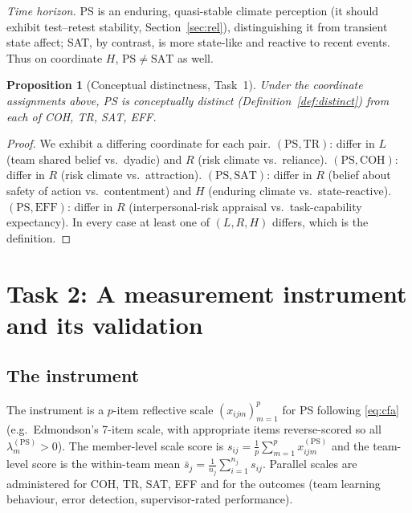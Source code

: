 \documentclass{amsart}
\newtheorem{proposition}{Proposition}
\theoremstyle{remark}
\begin{document}
\emph{Time horizon.} PS is an enduring, quasi-stable climate perception (it should
exhibit test--retest stability, Section~\ref{sec:rel}), distinguishing it from
transient state affect; SAT, by contrast, is more state-like and reactive to recent
events. Thus on coordinate $H$, $\mathrm{PS}\neq\mathrm{SAT}$ as well.

\begin{proposition}[Conceptual distinctness, Task~1]\label{prop:concept}
Under the coordinate assignments above, PS is conceptually distinct
(Definition~\ref{def:distinct}) from each of COH, TR, SAT, EFF.
\end{proposition}
\begin{proof}
We exhibit a differing coordinate for each pair. $(\mathrm{PS},\mathrm{TR})$:
differ in $L$ (team shared belief vs.\ dyadic) and $R$ (risk climate vs.\
reliance). $(\mathrm{PS},\mathrm{COH})$: differ in $R$ (risk climate vs.\
attraction). $(\mathrm{PS},\mathrm{SAT})$: differ in $R$ (belief about safety of
action vs.\ contentment) and $H$ (enduring climate vs.\ state-reactive).
$(\mathrm{PS},\mathrm{EFF})$: differ in $R$ (interpersonal-risk appraisal vs.\
task-capability expectancy). In every case at least one of $(L,R,H)$ differs, which
is the definition. \end{proof}

\section{Task 2: A measurement instrument and its validation}\label{sec:meas}

\subsection{The instrument}
The instrument is a $p$-item reflective scale $(x_{ijm})_{m=1}^{p}$ for PS
following \eqref{eq:cfa} (e.g.\ Edmondson's 7-item scale, with appropriate items
reverse-scored so all $\lambda^{(\mathrm{PS})}_m>0$). The member-level scale score
is $s_{ij}=\frac1p\sum_{m=1}^{p}x^{(\mathrm{PS})}_{ijm}$ and the team-level score is
the within-team mean $\bar s_{j}=\frac1{n_j}\sum_{i=1}^{n_j}s_{ij}$. Parallel
scales are administered for COH, TR, SAT, EFF and for the outcomes (team learning
behaviour, error detection, supervisor-rated performance).
\end{document}
